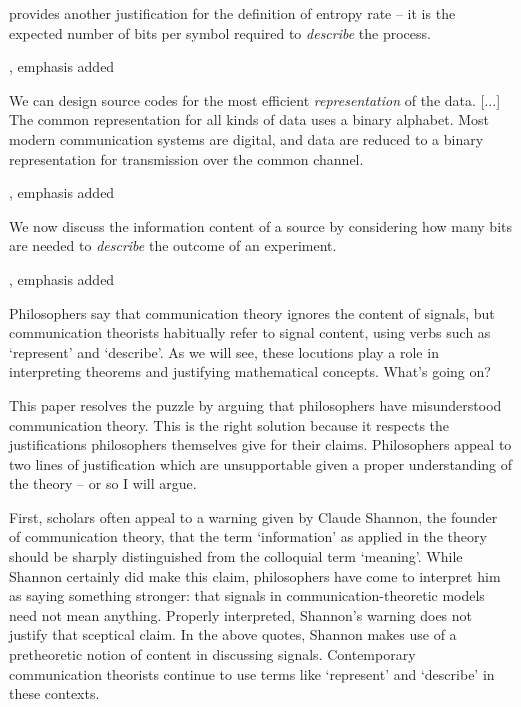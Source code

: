 \documentclass[12pt]{article}
\begin{document}
\begin{myquote}
 provides another justification for the definition of entropy rate -- it is the expected number of bits per symbol required to \textit{describe} the process.
\par\hspace*{\fill}\citet[115]{cover2006elements}, emphasis added
\end{myquote}

\begin{myquote}
We can design source codes for the most efficient \textit{representation} of the data. [...] The common representation for all kinds of data uses a binary alphabet. Most modern communication systems are digital, and data are reduced to a binary representation for transmission over the common channel.
\par\hspace*{\fill}\citet[218]{cover2006elements}, emphasis added
\end{myquote}

\begin{myquote}
We now discuss the information content of a source by considering how many bits are needed to \textit{describe} the outcome of an experiment.
\par\hspace*{\fill}\citet[73]{mackay2003information}, emphasis added
\end{myquote}

\noindent Philosophers say that communication theory ignores the content of signals, but communication theorists habitually refer to signal content, using verbs such as `represent' and `describe'.
As we will see, these locutions play a role in interpreting theorems and justifying mathematical concepts.
What's going on?

This paper resolves the puzzle by arguing that philosophers have misunderstood communication theory.
This is the right solution because it respects the justifications philosophers themselves give for their claims.
Philosophers appeal to two lines of justification which are unsupportable given a proper understanding of the theory -- or so I will argue.

First, scholars often appeal to a warning given by Claude Shannon, the founder of communication theory, that the term `information' as applied in the theory should be sharply distinguished from the colloquial term `meaning'.
While Shannon certainly did make this claim, philosophers have come to interpret him as saying something stronger: that signals in communication-theoretic models need not mean anything.
Properly interpreted, Shannon's warning does not justify that sceptical claim.
In the above quotes, Shannon makes use of a pretheoretic notion of content in discussing signals.
Contemporary communication theorists continue to use terms like `represent' and `describe' in these contexts.
\end{document}
